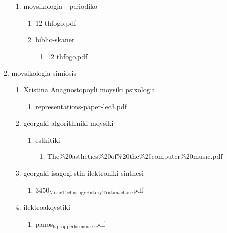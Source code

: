 \documentclass[11pt]{article}
\begin{document}
\begin{enumerate}
\begin{enumerate}
\begin{enumerate}
\item moysikologia - periodiko
\label{sec-1-1-1-1-49-2-2-1-73-10}
\begin{enumerate}
\item 12 thfogo.pdf
\label{sec-1-1-1-1-49-2-2-1-73-10-1}

\item biblio-skaner
\label{sec-1-1-1-1-49-2-2-1-73-10-2}
\begin{enumerate}
\item 12 thfogo.pdf
\label{sec-1-1-1-1-49-2-2-1-73-10-2-1}
\end{enumerate}
\end{enumerate}
\end{enumerate}

\item moysikologia simiosis
\label{sec-1-1-1-1-49-2-2-1-74}
\begin{enumerate}
\item Xristina Anagnostopoyli moysiki psixologia
\label{sec-1-1-1-1-49-2-2-1-74-1}
\begin{enumerate}
\item representations-paper-lec3.pdf
\label{sec-1-1-1-1-49-2-2-1-74-1-1}
\end{enumerate}

\item georgaki algorithmiki moysiki
\label{sec-1-1-1-1-49-2-2-1-74-2}
\begin{enumerate}
\item esthitiki
\label{sec-1-1-1-1-49-2-2-1-74-2-1}
\begin{enumerate}
\item The\%20asthetics\%20of\%20the\%20computer\%20music.pdf
\label{sec-1-1-1-1-49-2-2-1-74-2-1-1}
\end{enumerate}
\end{enumerate}

\item georgaki isagogi stin ilektroniki sinthesi
\label{sec-1-1-1-1-49-2-2-1-74-3}
\begin{enumerate}
\item 3450$_{\text{MusicTechnologyHistory}}$$_{\text{TristanJehan}}$.pdf
\label{sec-1-1-1-1-49-2-2-1-74-3-1}
\end{enumerate}

\item ilektroakoystiki
\label{sec-1-1-1-1-49-2-2-1-74-4}
\begin{enumerate}
\item panos$_{\text{laptop}}$$_{\text{performance}}$.pdf
\label{sec-1-1-1-1-49-2-2-1-74-4-1}
\end{enumerate}


\end{enumerate}
\end{enumerate}
\end{enumerate}
\end{document}
